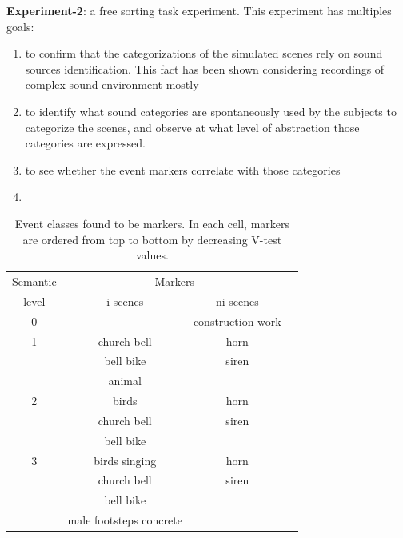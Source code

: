 \documentclass[twoside,twocolumn]{article}
\begin{document}
\textbf{Experiment-2}:  a free sorting task experiment. This experiment has multiples goals:
\begin{enumerate}
\item to confirm that the categorizations of the simulated scenes rely on sound sources identification. This fact has been shown considering recordings of complex sound environment mostly  \cite{maffiolo_caracterisation_1999,dubois2006cognitive}
\item to identify what sound categories are spontaneously used by the subjects to categorize the scenes, and observe at what level of abstraction those categories are expressed.
\item to see whether  the event markers   correlate with those categories  
\item  {}\\
\end{enumerate}


\begin{table}[t]
 \setlength{\tabcolsep}{0.1pt}
 \centering
  {\renewcommand{\arraystretch}{0.9}
\begin{tabular}{c c c c} 
Semantic   &  \multicolumn{2}{c}{Markers} \\
level & i-scenes & ni-scenes \\
\hline
0  &              &  construction work  \\
\hline
1  & church bell  & horn  \\
   & bell bike    & siren \\
   & animal       &       \\
   \hline
2  & birds         & horn  \\
   & church bell   & siren \\
   & bell bike     &       \\
   \hline
3  & birds singing & horn  \\
   & church bell   & siren \\
   & bell bike     &       \\
   & male footsteps concrete &  \\
  \hline
\end{tabular}
}
\vspace{0.5mm}
\caption{\label{tab:markers} Event classes found to be markers. In each cell, markers are ordered from top to bottom by decreasing V-test values.}
\end{table}
\end{document}
